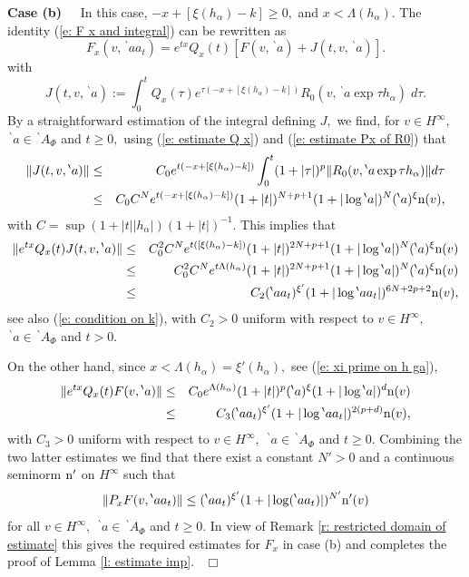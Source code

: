 \documentclass[12pt,a4paper]{article}
\def\qed{~\hfill\hbox{$\Box$}\medbreak}
\def\medno{\medbreak\noindent}
\def\ga{\alpha}
\numberwithin{Thm}{section}
\numberwithin{equation}{section}
\def\gL{\Lambda}
\numberwithin{equation}{section}
\def\gL{\Lambda}
\def\bp{\!{\,}^\backprime}
\begin{document}
\medno
{\bf Case (b)\ \ } In this case, $- x + [\xi(h_\ga) - k] \geq 0,$ and
$x < \gL(h_\ga).$ 
The identity  (\ref{e: F x and integral}) can be rewritten as
\begin{equation}
\label{e: Fx in terms of J}
F_x(v, \bp a a_t) = e^{tx} Q_x(t) [ F(v,\bp a) + J(t, v,\bp a)].
\end{equation} 
with 
$$ 
J(t, v,\bp a) := \int_0^t Q_x(\tau) e^{\tau(- x + [\xi(h_\ga) - k])} 
R_{0} (v, \bp a \exp \tau h_\ga)\; d\tau.
$$%
By a straightforward estimation of the integral defining $J,$ we find, 
for $v \in H^\infty, $ $\bp a\in \bp A_\Phi$ and $t \geq 0,$ 
using (\ref{e: estimate Q x}) and (\ref{e: estimate Px of R0})  that 
\begin{eqnarray*}
\|J(t, v, \bp a)\|& \leq & C_0 e^{t(- x + [\xi(h_\ga) - k])}  \int_0^t (1 + |\tau|)^p \|R_0(v, \bp a\exp \tau h_\ga)\| d\tau\\
&\leq & C_0 C^N e^{t(- x + [\xi(h_\ga) - k])} (1+|t|)^{N+p+1} (1 + |\log \bp a|)^N (\bp a)^\xi{\rm n}(v),
\end{eqnarray*}
with $C = \sup ( 1 + |t||h_\ga|)(1 +|t|)^{-1}.$ This implies that
\begin{eqnarray*}
\|e^{tx} Q_x(t) J(t,v,\bp a)\| & \leq &  C_0^2 C^N e^{t([\xi(h_\ga) - k])} (1+|t|)^{2N+p+1} 
(1 + |\log \bp a|)^N (\bp a)^\xi{\rm n}(v)\\
&\leq & 
C_0^2 C^N e^{t \gL(h_\ga)} (1 + |t|)^{2N + p+1} (1 + |\log \bp a|)^N (\bp a)^\xi{\rm n}(v)
\\
&\leq & C_2 (\bp a a_t)^{\xi'} (1 + |\log \bp a a_t|)^{6N + 2 p +2} {\rm n}(v),
\end{eqnarray*}
see also (\ref{e: condition on k}), with $C_2 >0$ uniform with respect to 
$v \in H^\infty,$ $\bp a \in \bp A_\Phi$ and $ t > 0.$

On the other hand, since $x < \gL(h_\ga) =\xi'(h_\ga),$ see (\ref{e: xi prime on h ga}),
\begin{eqnarray*}
\| e^{tx} Q_x(t) F(v,\bp a)\|  &   \leq  & C_0 e^{\gL(h_\ga)} (1 +|t|)^p (\bp a)^\xi(1 +| \log \bp a|)^d 
{\rm n}(v)\\
& \leq & 
C_3 (\bp a a_t)^{\xi'} (1 + |\log \bp aa_t|)^{2(p+d)} {\rm n}(v),
\end{eqnarray*}
with $C_3 > 0$ uniform with respect to $v \in H^\infty,$ $\bp a \in \bp A_\Phi$ and $t\geq 0.$ 
Combining the two latter estimates we find that there exist a constant $N'>0$ 
and a continuous seminorm ${\rm n}'$ on $H^\infty$ such that 
$$ 
\|P_x F(v,\bp a a_t) \|\leq (\bp aa_t)^{\xi'} ( 1+ |\log (\bp aa_t)|)^{N'} {\rm n}'(v)
$$%
for all $v \in H^\infty, $ $\bp a \in \bp A_\Phi$ and $t \geq 0.$ 
In view of Remark \ref{r: restricted domain of estimate} this gives the required estimates for $F_x$ in case (b) and completes the proof of Lemma \ref{l: estimate imp}.
\qed
\end{document}

